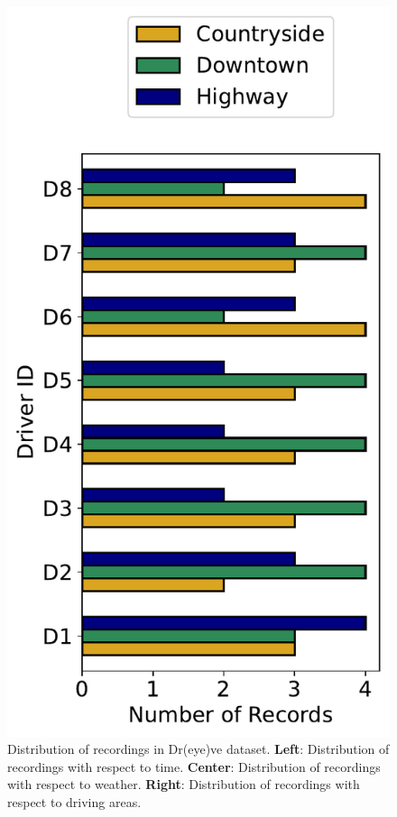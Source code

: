 \begin{figure}[h]
\begin{minipage}{0.33\textwidth}
        \centering
        \includegraphics[width=\textwidth]{images/dreyeve/area_distrib.pdf}
    \end{minipage}\hfill
    \caption[Distribution of recordings with respect to time, weather and areas.]
    {Distribution of recordings in Dr(eye)ve dataset. 
    \textbf{Left}: Distribution of recordings with respect to time.
    \textbf{Center}: Distribution of recordings with respect to weather.
    \textbf{Right}: Distribution of recordings with respect to driving areas.}
    \label{fig:dreyeve_rec_distrib}
\end{figure}

